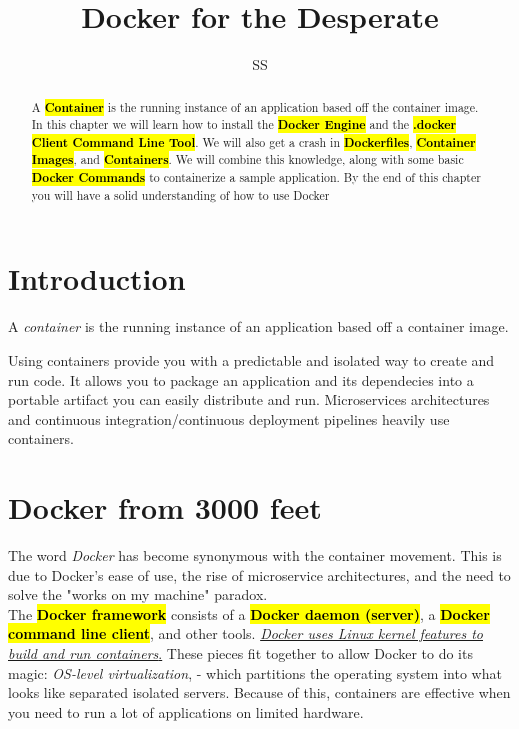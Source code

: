 \documentclass{article}
\title{Docker for the Desperate}
\author{SS}
\begin{document}
\maketitle

\begin{abstract}
A \textbf{\textcolor{red}{\hl{Container}}} is the running instance of an application based off the container image. In this chapter we will learn how to install the \textbf{\textcolor{red}{\hl{Docker Engine}}} and the \textbf{\textcolor{red}{\hl{.docker Client Command Line Tool}}}. We will also get a crash in \textbf{\textcolor{red}{\hl{Dockerfiles}}}, \textbf{\textcolor{red}{\hl{Container Images}}}, and \textbf{\textcolor{red}{\hl{Containers}}}. We will combine this knowledge, along with some basic \textbf{\textcolor{red}{\hl{Docker Commands}}} to containerize a sample application. By the end of this chapter you will have a solid understanding of how to use Docker 
\end{abstract}

\section{Introduction}
\begin{tcolorbox}[colback=red!5!white, colframe=red!50!black,title=Container ] 
A \textit{container} is the running instance of an application based off a container image.
\end{tcolorbox}
Using containers provide you with a predictable and isolated way to create and run code. It allows you to package an application and its dependecies into a portable artifact you can easily distribute and run. Microservices architectures and continuous integration/continuous deployment pipelines heavily use containers. \\

\section{Docker from 3000 feet}
The word \textit{Docker} has become synonymous with the container movement. This is due to Docker's ease of use, the rise of microservice architectures, and the need to solve the "works on my machine" paradox. \\
The \textbf{\textcolor{red}{\hl{Docker framework}}} consists of a \textbf{\textcolor{red}{\hl{Docker daemon (server)}}}, a \textbf{\textcolor{red}{\hl{Docker command line client}}}, and other tools. \underline{ \textit{Docker uses Linux kernel features to build and run containers}.} These pieces fit together to allow Docker to do its magic: \textit{OS-level virtualization}, - which partitions the operating system into what looks like separated isolated servers. Because of this, containers are effective when you need to run a lot of applications on limited hardware. 
\\
\end{document}
